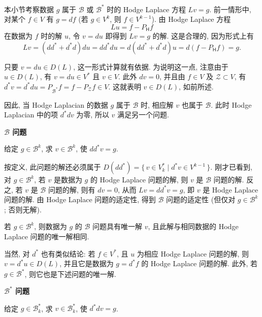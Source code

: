 本小节考察数据 $g$ 属于 $\mathcal B$ 或 $\mathcal B^*$ 时的 Hodge Laplace 方程 $Lv=g$. 前一情形中, 对某个 $f\in V$ 有 $g=df$ (若 $g\in V^k$, 则 $f\in V^{k-1}$). 由 Hodge Laplace 方程
\begin{equation}\label{eq:hodge-boundary-problem-potential}
Lu=f-P_{\mathsf H}f
\end{equation}
在数据为 $f$ 时的解 $u$, 令 $v=du$ 即得到 $Lv=g$ 的解. 这是合理的, 因为形式上有
\[
Lv=(dd^*+d^*d)du=dd^*du=d(dd^*+d^*d)u=d(f-P_{\mathsf H}f)=g.
\]

只要 $v=du\in D(L)$, 这一形式计算就有依据. 为说明这一点, 注意由于 $u\in D(L)$, 有 $v=du\in V^*$ 且 $v\in V$. 此外 $dv=0$, 并且由 $f\in V$ 及 $\mathcal Z\subset V$, 有 $d^*v=d^*du=P_{\mathcal B^*}f=f-P_{\mathcal Z}f\in V$. 这就表明 $v\in D(L)$, 如前所述.

因此, 当 Hodge Laplacian 的数据 $g$ 属于 $\mathcal B$ 时, 相应解 $v$ 也属于 $\mathcal B$. 此时 Hodge Laplacian 中的项 $d^*dv$ 为零, 所以 $v$ 满足另一个问题.

\medskip\noindent\textbf{{$\mathcal B$ 问题}}\par
给定 $g\in\mathcal B^k$, 求 $v\in\mathcal B^k$, 使 $dd^*v=g$.

按定义, 此问题的解还必须属于 $D(dd^*)=\{\,v\in V_k^*\mid d^*v\in V^{k-1}\,\}$. 刚才已看到, 对 $g\in\mathcal B^k$, 若 $v$ 是数据为 $g$ 的 Hodge Laplace 问题的解, 则 $v$ 是 $\mathcal B$ 问题的解. 反之, 若 $v$ 是 $\mathcal B$ 问题的解, 则有 $dv=0$, 从而 $Lv=dd^*v=g$, 即 $v$ 是 Hodge Laplace 问题的解. 由 Hodge Laplace 问题的适定性, 得到 $\mathcal B$ 问题的适定性 (但仅对 $g\in\mathcal B^k$; 否则无解).

\begin{Theorem}\label{thm:hodge-boundary-problem}
若 $g\in\mathcal B^k$, 则数据为 $g$ 的 $\mathcal B$ 问题具有唯一解 $v$, 且此解与相同数据的 Hodge Laplace 问题的唯一解相同.
\end{Theorem}

当然, 对 $d^*$ 也有类似结论: 若 $f\in V^*$, 且 $u$ 为相应 Hodge Laplace 问题的解, 则 $v=d^*u\in D(L)$, 并且它是数据为 $g=d^*f$ 的 Hodge Laplace 问题的解. 此外, 若 $g\in\mathcal B^*$, 则它也是下述问题的唯一解.

\medskip\noindent\textbf{{$\mathcal B^*$ 问题}}\par
给定 $g\in\mathcal B_k^*$, 求 $v\in\mathcal B_k^*$, 使 $d^*dv=g$.
